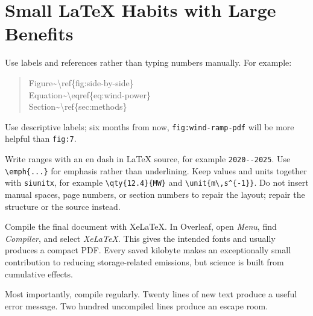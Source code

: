 \documentclass[masters,en,listoffigures,listoftables,acronyms]{NMBU}
\begin{document}
\section{Small LaTeX Habits with Large Benefits}
\label{app:latex}

Use labels and references rather than typing numbers manually. For example:

\begin{quote}
\ttfamily
Figure\textasciitilde\textbackslash ref\{fig:side-by-side\}\\
Equation\textasciitilde\textbackslash eqref\{eq:wind-power\}\\
Section\textasciitilde\textbackslash ref\{sec:methods\}
\end{quote}

Use descriptive labels; six months from now, \verb|fig:wind-ramp-pdf| will be
more helpful than \verb|fig:7|.

Write ranges with an en dash in LaTeX source, for example \verb|2020--2025|.
Use \verb|\emph{...}| for emphasis rather than underlining. Keep values and
units together with \texttt{siunitx}, for example
\verb|\qty{12.4}{MW}| and \verb|\unit{m\,s^{-1}}|. Do not insert manual spaces,
page numbers, or section numbers to repair the layout; repair the structure or
the source instead.

Compile the final document with XeLaTeX. In Overleaf, open \emph{Menu}, find
\emph{Compiler}, and select \emph{XeLaTeX}. This gives the intended fonts and
usually produces a compact PDF. Every saved kilobyte makes an exceptionally
small contribution to reducing storage-related emissions, but science is built
from cumulative effects.

Most importantly, compile regularly. Twenty lines of new text produce a useful
error message. Two hundred uncompiled lines produce an escape room.
\end{document}
